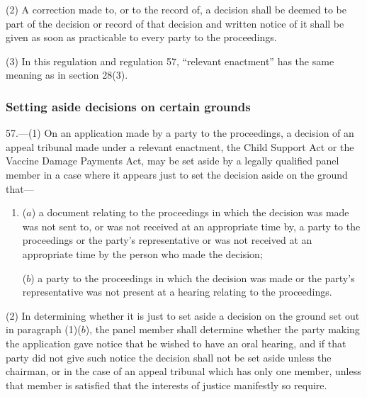 \documentclass[12pt,a4paper]{article}
\begin{document}
(2) A correction made to, or to the record of, a decision shall be deemed to be part of the decision or record of that decision and written notice of it shall be given as soon as practicable to every party to the proceedings.

(3) In this regulation and regulation 57, “relevant enactment” has the same meaning as in section 28(3).


\subsubsection[57. Setting aside decisions on certain grounds]{Setting aside decisions on certain grounds}

57.—(1) On an application made by a party to the proceedings, a decision of an appeal tribunal made under a relevant enactment, the Child Support Act or the Vaccine Damage Payments Act, may be set aside by a legally qualified panel member in a case where it appears just to set the decision aside on the ground that—
\begin{enumerate}\item[]
($a$) a document relating to the proceedings in which the decision was made was not sent to, or was not received at an appropriate time by, a party to the proceedings or the party’s representative or was not received at an appropriate time by the person who made the decision;

($b$) a party to the proceedings in which the decision was made or the party’s representative was not present at a hearing relating to the proceedings.
\end{enumerate}

(2) In determining whether it is just to set aside a decision on the ground set out in paragraph (1)($b$), the panel member shall determine whether the party making the application gave notice that he wished to have an oral hearing, and if that party did not give such notice the decision shall not be set aside unless the chairman, or in the case of an appeal tribunal which has only one member, unless that member is satisfied that the interests of justice manifestly so require.

\end{document}

